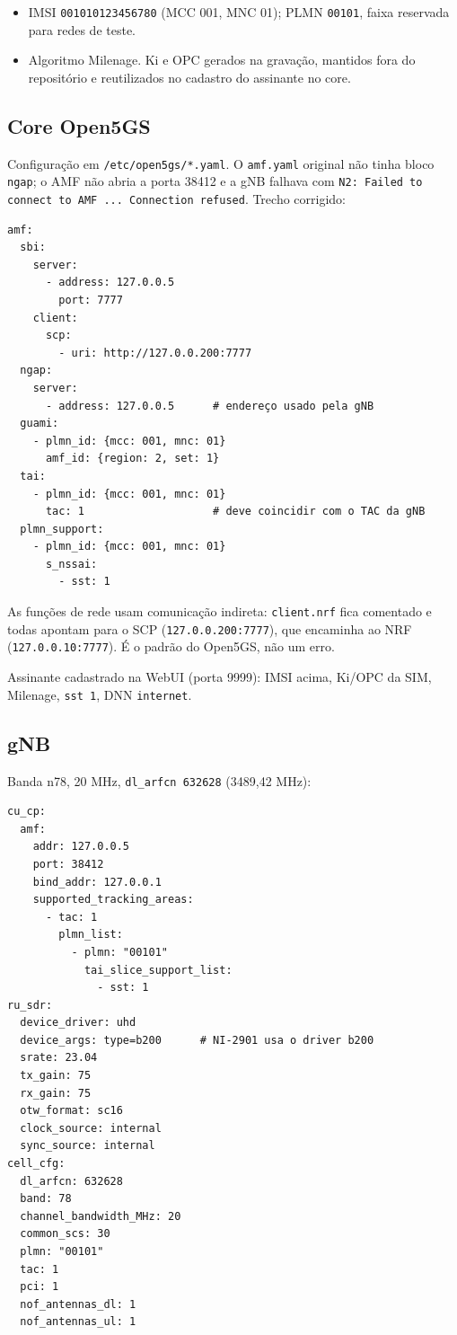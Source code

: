 \documentclass[11pt,a4paper]{article}
\newcommand{\code}[1]{\texttt{#1}}
\begin{document}
\begin{itemize}
  \item IMSI \code{001010123456780} (MCC 001, MNC 01); PLMN \code{00101},
    faixa reservada para redes de teste.
  \item Algoritmo Milenage. Ki e OPC gerados na gravação, mantidos fora do
    repositório e reutilizados no cadastro do assinante no core.
\end{itemize}

\subsection{Core Open5GS}

Configuração em \code{/etc/open5gs/*.yaml}. O \code{amf.yaml} original não
tinha bloco \code{ngap}; o AMF não abria a porta 38412 e a gNB falhava com
\code{N2: Failed to connect to AMF ... Connection refused}. Trecho corrigido:

\begin{lstlisting}[style=yaml]
amf:
  sbi:
    server:
      - address: 127.0.0.5
        port: 7777
    client:
      scp:
        - uri: http://127.0.0.200:7777
  ngap:
    server:
      - address: 127.0.0.5      # endereço usado pela gNB
  guami:
    - plmn_id: {mcc: 001, mnc: 01}
      amf_id: {region: 2, set: 1}
  tai:
    - plmn_id: {mcc: 001, mnc: 01}
      tac: 1                    # deve coincidir com o TAC da gNB
  plmn_support:
    - plmn_id: {mcc: 001, mnc: 01}
      s_nssai:
        - sst: 1
\end{lstlisting}

As funções de rede usam comunicação indireta: \code{client.nrf} fica
comentado e todas apontam para o SCP (\code{127.0.0.200:7777}), que encaminha
ao NRF (\code{127.0.0.10:7777}). É o padrão do Open5GS, não um erro.

Assinante cadastrado na WebUI (porta 9999): IMSI acima, Ki/OPC da SIM,
Milenage, \code{sst 1}, DNN \code{internet}.

\subsection{gNB}

Banda n78, 20 MHz, \code{dl\_arfcn 632628} (3489,42 MHz):

\begin{lstlisting}[style=yaml]
cu_cp:
  amf:
    addr: 127.0.0.5
    port: 38412
    bind_addr: 127.0.0.1
    supported_tracking_areas:
      - tac: 1
        plmn_list:
          - plmn: "00101"
            tai_slice_support_list:
              - sst: 1
ru_sdr:
  device_driver: uhd
  device_args: type=b200      # NI-2901 usa o driver b200
  srate: 23.04
  tx_gain: 75
  rx_gain: 75
  otw_format: sc16
  clock_source: internal
  sync_source: internal
cell_cfg:
  dl_arfcn: 632628
  band: 78
  channel_bandwidth_MHz: 20
  common_scs: 30
  plmn: "00101"
  tac: 1
  pci: 1
  nof_antennas_dl: 1
  nof_antennas_ul: 1
\end{lstlisting}
\end{document}
